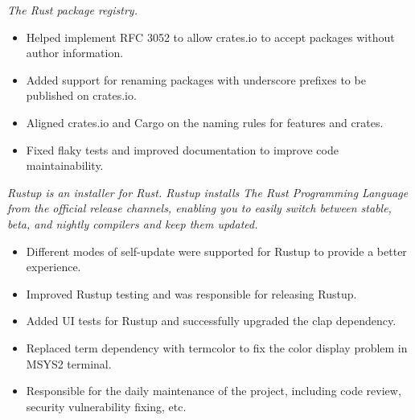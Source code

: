 \documentclass{software_engineer_rustin_liu}
\newcommand{\en}[1]{#1}
\newcommand{\zh}[1]{}
\begin{document}
\en{}
\zh{\datedsubsection{\textbf{crates.io - 维护者}}{{\href{https://github.com/rust-lang/crates.io/commits?author=hi-rustin}{60+ commits}}}}
\en{\textsl{The Rust package registry.}}
\zh{\textsl{Rust 包管理中心。}}

\begin{itemize}
      \item \en{Helped implement RFC 3052 to allow crates.io to accept packages without author information.}
            \zh{帮助实现 RFC 3052，让 crates.io 开始接受无作者信息的包。}
      \item \en{Added support for renaming packages with underscore prefixes to be published on crates.io.}
            \zh{支持下划线前缀的重命名包在 crates.io 的发布。}
      \item \en{Aligned crates.io and Cargo on the naming rules for features and crates.}
            \zh{对齐了 crates.io 和 Cargo 对 feature 和 crate 的名称校验规则。}
      \item \en{Fixed flaky tests and improved documentation to improve code maintainability.}
            \zh{修复不稳定测试，完善文档，提升代码可维护性。}
\end{itemize}


\en{}
\zh{\datedsubsection{\textbf{Rustup - 前维护者}}{{\href{https://github.com/rust-lang/rustup/commits?author=hi-rustin}{110+ commits}}}}
\en{\textsl{Rustup is an installer for Rust. Rustup installs The Rust Programming Language from the official release channels, enabling you to easily switch between stable, beta, and nightly compilers and keep them updated.}}
\zh{\textsl{Rustup 是 Rust 的安装器。Rustup 从官方发布渠道安装 Rust 编程语言，使用户可以轻松地在稳定版、测试版和夜版编译器之间切换并保持更新。}}

\begin{itemize}
      \item \en{Different modes of self-update were supported for Rustup to provide a better experience.}
            \zh{为 Rustup 支持了 self-update 的不同模式来提供更好的使用体验。}
      \item \en{Improved Rustup testing and was responsible for releasing Rustup.}
            \zh{改善 Rustup 测试，负责发布 Rustup。}
      \item \en{Added UI tests for Rustup and successfully upgraded the clap dependency.}
            \zh{为 Rustup 添加了 UI 测试，顺利升级了 clap 依赖。}
      \item \en{Replaced term dependency with termcolor to fix the color display problem in MSYS2 terminal.}
            \zh{将 term 依赖替换为 termcolor，修复了 MSYS2 终端下颜色显示的问题。}
      \item \en{Responsible for the daily maintenance of the project, including code review, security vulnerability fixing, etc.}
            \zh{负责项目日常维护，包括代码审查、依赖升级、安全漏洞修复等。}
\end{itemize}
\end{document}
